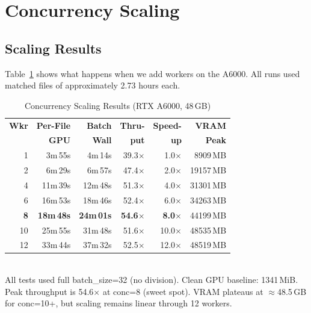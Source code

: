 \documentclass[conference,10pt]{IEEEtran}
\begin{document}
\section{Concurrency Scaling}

\subsection{Scaling Results}

Table~\ref{tab:scaling} shows what happens when we add workers on the A6000.
All runs used matched files of approximately 2.73 hours each.

\begin{table}[!t]
\centering
\caption{Concurrency Scaling Results (RTX A6000, 48\,GB)}
\label{tab:scaling}
\begin{tabular}{@{}rrrrrr@{}}
\toprule
\textbf{Wkr} & \textbf{Per-File} & \textbf{Batch} & \textbf{Thru-} & \textbf{Speed-} & \textbf{VRAM} \\
              & \textbf{GPU} & \textbf{Wall} & \textbf{put} & \textbf{up} & \textbf{Peak} \\
\midrule
1  & 3m\,55s  & 4m\,14s  & 39.3$\times$ & 1.0$\times$  & \num{8909}\,MB \\
2  & 6m\,29s  & 6m\,57s  & 47.4$\times$ & 2.0$\times$  & \num{19157}\,MB \\
4  & 11m\,39s & 12m\,48s & 51.3$\times$ & 4.0$\times$  & \num{31301}\,MB \\
6  & 16m\,53s & 18m\,46s & 52.4$\times$ & 6.0$\times$  & \num{34263}\,MB \\
\textbf{8}  & \textbf{18m\,48s} & \textbf{24m\,01s} & \textbf{54.6$\times$} & \textbf{8.0$\times$}  & \num{44199}\,MB \\
10 & 25m\,55s & 31m\,48s & 51.6$\times$ & 10.0$\times$ & \num{48535}\,MB \\
12 & 33m\,44s & 37m\,32s & 52.5$\times$ & 12.0$\times$ & \num{48519}\,MB \\
\bottomrule
\end{tabular}
\\[4pt]
{\footnotesize All tests used full batch\_size=32 (no division). Clean GPU
  baseline: \num{1341}\,MiB. Peak throughput is 54.6$\times$ at conc=8
  (sweet spot). VRAM plateaus at $\approx$48.5\,GB for conc=10+, but
  scaling remains linear through 12 workers.}
\end{table}
\end{document}
